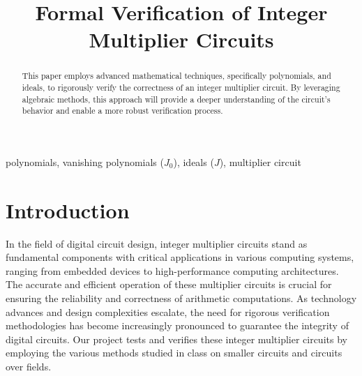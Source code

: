 \documentclass[conference]{IEEEtran}
\begin{document}
\title{Formal Verification of Integer Multiplier Circuits\\}

\author{
\and
{}
\and
{}
\and
{}
}

\maketitle

\begin{abstract}
This paper employs advanced mathematical techniques, specifically polynomials, and ideals, 
to rigorously verify the correctness of an integer multiplier circuit. By leveraging algebraic methods, 
this approach will provide a deeper understanding of the circuit's behavior and enable a more robust 
verification process. 
\end{abstract}

\begin{IEEEkeywords}
polynomials, vanishing polynomials ($J_{0}$), ideals ($J$), multiplier circuit
\end{IEEEkeywords}

\section{Introduction}
In the field of digital circuit design, integer multiplier circuits stand as fundamental components with critical applications in various computing 
systems, ranging from embedded devices to high-performance computing architectures. The accurate and efficient operation of these multiplier 
circuits is crucial for ensuring the reliability and correctness of arithmetic computations. As technology advances and design complexities 
escalate, the need for rigorous verification methodologies has become increasingly pronounced to guarantee the integrity of digital circuits. Our 
project tests and verifies these integer multiplier circuits by employing the various methods studied in class on smaller circuits and circuits over fields.
\end{document}
